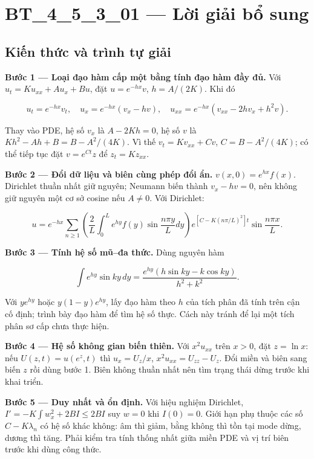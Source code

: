\documentclass[10pt,a4paper]{article}
\begin{document}
\section*{BT\_4\_5\_3\_01 — Lời giải bổ sung}
\subsection*{Kiến thức và trình tự giải}
\textbf{Bước 1 — Loại đạo hàm cấp một bằng tính đạo hàm đầy đủ.} Với $u_t=Ku_{xx}+Au_x+Bu$, đặt $u=e^{-hx}v$, $h=A/(2K)$. Khi đó


\[
u_t=e^{-hx}v_t,\quad u_x=e^{-hx}(v_x-hv),\quad
u_{xx}=e^{-hx}(v_{xx}-2hv_x+h^2v).
\]


Thay vào PDE, hệ số $v_x$ là $A-2Kh=0$, hệ số $v$ là $Kh^2-Ah+B=B-A^2/(4K)$. Vì thế $v_t=Kv_{xx}+Cv$, $C=B-A^2/(4K)$; có thể tiếp tục đặt $v=e^{Ct}z$ để $z_t=Kz_{xx}$.

\textbf{Bước 2 — Đổi dữ liệu và biên cùng phép đổi ẩn.} $v(x,0)=e^{hx}f(x)$. Dirichlet thuần nhất giữ nguyên; Neumann biến thành $v_x-hv=0$, nên không giữ nguyên một cơ sở cosine nếu $A\ne0$. Với Dirichlet:


\[
u=e^{-hx}\sum_{n\ge1}\left(\frac2L\int_0^Le^{hy}f(y)\sin\frac{n\pi y}Ldy\right)
e^{[C-K(n\pi/L)^2]t}\sin\frac{n\pi x}L.
\]


\textbf{Bước 3 — Tính hệ số mũ–đa thức.} Dùng nguyên hàm


\[
\int e^{hy}\sin ky\,dy
=\frac{e^{hy}(h\sin ky-k\cos ky)}{h^2+k^2}.
\]


Với $y e^{hy}$ hoặc $y(1-y)e^{hy}$, lấy đạo hàm theo $h$ của tích phân đã tính trên cận cố định; trình bày đạo hàm để tìm hệ số thực. Cách này tránh để lại một tích phân sơ cấp chưa thực hiện.

\textbf{Bước 4 — Hệ số không gian biến thiên.} Với $x^2u_{xx}$ trên $x>0$, đặt $z=\ln x$: nếu $U(z,t)=u(e^z,t)$ thì $u_x=U_z/x$, $x^2u_{xx}=U_{zz}-U_z$. Đổi miền và biên sang biến $z$ rồi dùng bước 1. Biên không thuần nhất nên tìm trạng thái dừng trước khi khai triển.

\textbf{Bước 5 — Duy nhất và ổn định.} Với hiệu nghiệm Dirichlet, $I'=-K\int w_x^2+2BI\le2BI$ suy $w=0$ khi $I(0)=0$. Giới hạn phụ thuộc các số $C-K\lambda_n$ có hệ số khác không: âm thì giảm, bằng không thì tồn tại mode dừng, dương thì tăng. Phải kiểm tra tính thống nhất giữa miền PDE và vị trí biên trước khi dùng công thức.
\end{document}

